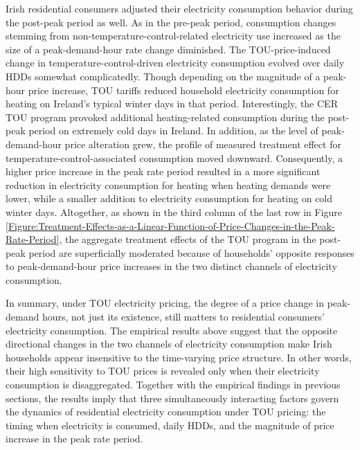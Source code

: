 Irish residential consumers adjusted their electricity consumption behavior during the post-peak period as well. As in the pre-peak period, consumption changes stemming from non-temperature-control-related electricity use increased as the size of a peak-demand-hour rate change diminished. The TOU-price-induced change in temperature-control-driven electricity consumption evolved over daily HDDs somewhat complicatedly. Though depending on the magnitude of a peak-hour price increase, TOU tariffs reduced household electricity consumption for heating on Ireland's typical winter days in that period. Interestingly, the CER TOU program provoked additional heating-related consumption during the post-peak period on extremely cold days in Ireland. In addition, as the level of peak-demand-hour price alteration grew, the profile of measured treatment effect for temperature-control-associated consumption moved downward. Consequently, a higher price increase in the peak rate period resulted in a more significant reduction in electricity consumption for heating when heating demands were lower, while a smaller addition to electricity consumption for heating on cold winter days. Altogether, as shown in the third column of the last row in Figure \ref{Figure:Treatment-Effects-as-a-Linear-Function-of-Price-Changes-in-the-Peak-Rate-Period}, the aggregate treatment effects of the TOU program in the post-peak period are superficially moderated because of households' opposite responses to peak-demand-hour price increases in the two distinct channels of electricity consumption.

In summary, under TOU electricity pricing, the degree of a price change in peak-demand hours, not just its existence, still matters to residential consumers' electricity consumption. The empirical results above suggest that the opposite directional changes in the two channels of electricity consumption make Irish households appear insensitive to the time-varying price structure. In other words, their high sensitivity to TOU prices is revealed only when their electricity consumption is disaggregated. Together with the empirical findings in previous sections, the results imply that three simultaneously interacting factors govern the dynamics of residential electricity consumption under TOU pricing: the timing when electricity is consumed, daily HDDs, and the magnitude of price increase in the peak rate period.  
